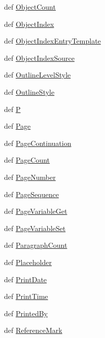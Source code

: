 \begin{DoxyCompactItemize}
\item 
def \hyperlink{namespaceodf_1_1text_a5dd6275e31a1457c8db8df116f08b37c}{Object\+Count}
\item 
def \hyperlink{namespaceodf_1_1text_aeadeed771c5e1ec5ddb918db97cc036b}{Object\+Index}
\item 
def \hyperlink{namespaceodf_1_1text_a33ba49cd7d74c2410d1d9402f6e5c814}{Object\+Index\+Entry\+Template}
\item 
def \hyperlink{namespaceodf_1_1text_ae7250c9198e86e107f486f2757da99a8}{Object\+Index\+Source}
\item 
def \hyperlink{namespaceodf_1_1text_a9998664b135433170a7fd55a04af6554}{Outline\+Level\+Style}
\item 
def \hyperlink{namespaceodf_1_1text_acc45767168a394fadc32f35ca9098df8}{Outline\+Style}
\item 
def \hyperlink{namespaceodf_1_1text_aef721eaa9a8962785aa8d5b10fffbaf4}{P}
\item 
def \hyperlink{namespaceodf_1_1text_acac968c65e99372d8e331db5b924ec4c}{Page}
\item 
def \hyperlink{namespaceodf_1_1text_ae3e97c7279bbb530a84ff4a64043d31f}{Page\+Continuation}
\item 
def \hyperlink{namespaceodf_1_1text_a258419b169365e537b87d1df511e039f}{Page\+Count}
\item 
def \hyperlink{namespaceodf_1_1text_aede4914caa72fe9ed7561fe3a3087446}{Page\+Number}
\item 
def \hyperlink{namespaceodf_1_1text_a4cc67859deadd97d5d1721fddb33d756}{Page\+Sequence}
\item 
def \hyperlink{namespaceodf_1_1text_aab835a3d8d34735c4f32793c05ccf514}{Page\+Variable\+Get}
\item 
def \hyperlink{namespaceodf_1_1text_a323f7bdfd8d00d8de3be689d0923c253}{Page\+Variable\+Set}
\item 
def \hyperlink{namespaceodf_1_1text_a317426765af2ff87a66df006d2bb4f85}{Paragraph\+Count}
\item 
def \hyperlink{namespaceodf_1_1text_a06fb024f275d5a106a74313e8a387f43}{Placeholder}
\item 
def \hyperlink{namespaceodf_1_1text_a1e78f99e1eb3886f9b5f9b82d150600b}{Print\+Date}
\item 
def \hyperlink{namespaceodf_1_1text_a5667be88ab25af530c65cd5a2c8f87f3}{Print\+Time}
\item 
def \hyperlink{namespaceodf_1_1text_aafa82e1d27e27a199391b0579f93ecaf}{Printed\+By}
\item 
def \hyperlink{namespaceodf_1_1text_a77d62eead71b01e6e732b29c038cfc39}{Reference\+Mark}

\end{DoxyCompactItemize}
